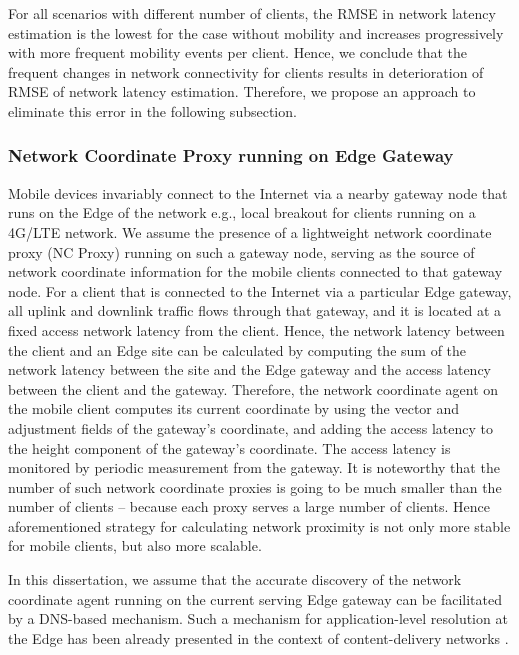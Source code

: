 For all scenarios with different number of clients, the RMSE in network latency estimation is the lowest for the case without mobility and increases progressively with more frequent mobility events per client. Hence, we conclude that the frequent changes in network connectivity for clients results in deterioration of RMSE of network latency estimation. Therefore, we propose an approach to eliminate this error in the following subsection.

\subsubsection{Network Coordinate Proxy running on Edge Gateway}
Mobile devices invariably connect to the Internet via a nearby gateway node that runs on the Edge of the network e.g., local breakout \cite{localbreakout} for clients running on a 4G/LTE network. We assume the presence of a lightweight network coordinate proxy (NC Proxy) running on such a gateway node, serving as the source of network coordinate information for the mobile clients connected to that gateway node. For a client that is connected to the Internet via a particular Edge gateway, all uplink and downlink traffic flows through that gateway, and it is located at a fixed access network latency from the client. Hence, the network latency between the client and an Edge site can be calculated by computing the sum of the network latency between the site and the Edge gateway and the access latency between the client and the gateway. Therefore, the network coordinate agent on the mobile client computes its current coordinate by using the vector and adjustment fields of the gateway's coordinate, and adding the access latency to the height component of the gateway's coordinate. The access latency is monitored by periodic measurement from the gateway. It is noteworthy that the number of such network coordinate proxies is going to be much smaller than the number of clients -- because each proxy serves a large number of clients. Hence aforementioned strategy for calculating network proximity is not only more stable for mobile clients, but also more scalable. 

\par In this dissertation, we assume that the accurate discovery of the network coordinate agent running on the current serving Edge gateway can be facilitated by a DNS-based mechanism. Such a mechanism for application-level resolution at the Edge has been already presented in the context of content-delivery networks \cite{hsu2020dns}. 

